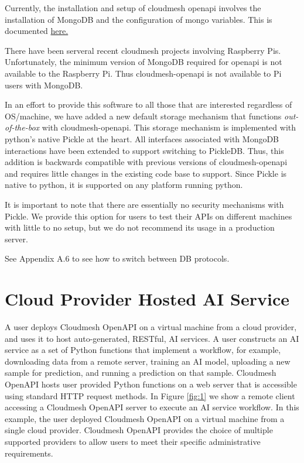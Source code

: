 Currently, the installation and setup of cloudmesh openapi involves the
installation of MongoDB and the configuration of mongo variables. This
is documented
\href{https://github.com/cloudmesh/cloudmesh-openapi\#installation}{here.}

There have been serveral recent cloudmesh projects involving Raspberry
Pis. Unfortunately, the minimum version of MongoDB required for openapi
is not available to the Raspberry Pi. Thus cloudmesh-openapi is not
available to Pi users with MongoDB.

In an effort to provide this software to all those that are interested
regardless of OS/machine, we have added a new default storage mechanism
that functions {\em out-of-the-box} with cloudmesh-openapi. This storage
mechanism is implemented with python's native Pickle at the heart. All
interfaces associated with MongoDB interactions have been extended to
support switching to PickleDB. Thus, this addition is backwards
compatible with previous versions of cloudmesh-openapi and requires
little changes in the existing code base to support. Since Pickle is
native to python, it is supported on any platform running python.

It is important to note that there are essentially no security
mechanisms with Pickle. We provide this option for users to test their
APIs on different machines with little to no setup, but we do not
recommend its usage in a production server.

See Appendix A.6 to see how to switch between DB protocols.

\section{Cloud Provider Hosted AI
Service}\label{cloud-provider-hosted-ai-service}

A user deploys Cloudmesh OpenAPI on a virtual machine from a cloud
provider, and uses it to host auto-generated, RESTful, AI services. A
user constructs an AI service as a set of Python functions that
implement a workflow, for example, downloading data from a remote
server, training an AI model, uploading a new sample for prediction, and
running a prediction on that sample. Cloudmesh OpenAPI hosts user
provided Python functions on a web server that is accessible using
standard HTTP request methods. In Figure \ref{fig:1} we show a remote client
accessing a Cloudmesh OpenAPI server to execute an AI service workflow.
In this example, the user deployed Cloudmesh OpenAPI on a virtual
machine from a single cloud provider. Cloudmesh OpenAPI provides the
choice of multiple supported providers to allow users to meet their
specific administrative requirements.

